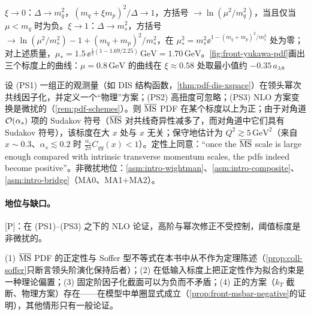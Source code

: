 \begin{example}\label{ex:front-yukawa}
$\xi\to0$：$\Delta\to m_q^2$，$(m_q+\xi m_p)^2/\Delta\to1$，方括号 $\to\ln(\mu^2/m_q^2)$，当且仅当 $\mu<m_q$ 时为负。$\xi\to1$：$\Delta\to m_s^2$，方括号 $\to\ln(\mu^2/m_s^2)-1+(m_q+m_p)^2/m_s^2$，在 $\mu_*^2=m_s^2\ee^{1-(m_q+m_p)^2/m_s^2}$ 处为零；对上述质量，$\mu_*=1.5\,\ee^{\frac12(1-1.69/2.25)}\,\mathrm{GeV}=1.70\,\mathrm{GeV}$。\cref{fig:front-yukawa-pdf}画出三个标度上的曲线：$\mu=0.8\,\mathrm{GeV}$ 的曲线在 $\xi\approx0.58$ 处取最小值约 $-0.35\,a_\lambda$。
\end{example}

\begin{proposition}\label{prop:front-positivity-large-scale}
设 (PS1) 一组正的观测量（如 DIS 结构函数，\cref{thm:pdf-dis-xspace}）在领头幂次共线因子化，并定义一个“物理”方案；(PS2) 高扭度可忽略；(PS3) NLO 方案变换是微扰的（\cref{rem:pdf-schemes}）。则 $\overline{\mathrm{MS}}$ PDF 在某个标度以上为正；由于对角道 $\mathcal{O}\!\left(\alpha_s\right)$ 项的 Sudakov 符号（$\overline{\mathrm{MS}}$ 对共线奇异性减多了，而对角道中它们具有 Sudakov 符号），该标度在大 $x$ 处与 $x$ 无关；\cite{Candido:2023ujx}保守地估计为 $Q^2\gtrsim5\,\mathrm{GeV}^2$（来自 $x\sim0.3$、$\alpha_s\lesssim0.2$ 时 $\frac{\alpha_s}{2\pi}C_{gg}(x)<1$）。\cite{CollinsRogersSato2022}定性上同意：“once the $\overline{\rm MS}$ scale is large enough compared with intrinsic transverse momentum scales, the pdfs indeed become positive”。非微扰地位：\cref{asm:intro-wightman}、\cref{asm:intro-composite}、\cref{asm:intro-bridge}（MA0、MA1+MA2）。
\end{proposition}

\paragraph{地位与缺口。}[P]：在 (PS1)--(PS3) 之下的 NLO 论证，高阶与幂次修正不受控制，阈值标度是非微扰的。

\begin{remark}[对本书与拟合的后果]\label{rem:front-positivity-tracks}
(1) $\overline{\mathrm{MS}}$ PDF 的正定性与 Soffer 型不等式在本书中从不作为定理陈述（\cref{prop:coll-soffer}只断言领头阶演化保持后者）；(2) 在低输入标度上把正定性作为拟合约束是一种理论偏置\cite{CollinsRogersSato2022}；(3) 固定阶因子化截面可以为负而不矛盾\cite[附录~A]{CollinsRogersSato2022}；(4) 正的方案（$k_T$ 截断、物理方案）存在——在模型中单圈显式成立（\cref{prop:front-msbar-negative}的证明），其他情形只有一般论证。
\end{remark}

